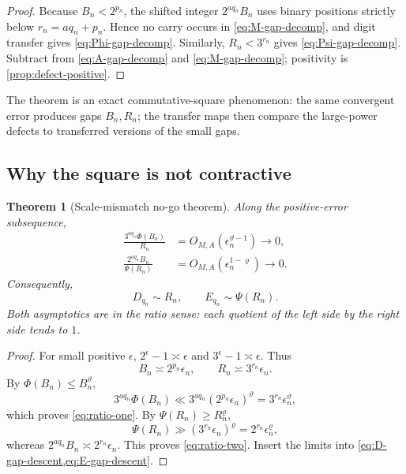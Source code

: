 \documentclass[11pt]{article}
\newtheorem{theorem}{Theorem}[section]
\theoremstyle{definition}
\begin{document}
\begin{proof}
Because \(B_n<2^{p_n}\), the shifted integer \(2^{aq_n}B_n\) uses binary
positions strictly below \(r_n=aq_n+p_n\).  Hence no carry occurs in
\cref{eq:M-gap-decomp}, and digit transfer gives
\cref{eq:Phi-gap-decomp}.  Similarly, \(R_n<3^{r_n}\) gives
\cref{eq:Psi-gap-decomp}.  Subtract from \cref{eq:A-gap-decomp} and
\cref{eq:M-gap-decomp}; positivity is \cref{prop:defect-positive}.
\end{proof}

The theorem is an exact commutative-square phenomenon: the same convergent
error produces gaps \(B_n,R_n\); the transfer maps then compare the
large-power defects to transferred versions of the small gaps.

\subsection{Why the square is not contractive}

\begin{theorem}[Scale-mismatch no-go theorem]\label{thm:scale-mismatch}
Along the positive-error subsequence,
\begin{align}
 \frac{3^{aq_n}\Phi(B_n)}{R_n}
 &=O_{M,A}(\epsilon_n^{\vartheta-1})\longrightarrow0,
 \label{eq:ratio-one}\\
 \frac{2^{aq_n}B_n}{\Psi(R_n)}
 &=O_{M,A}(\epsilon_n^{1-\varrho})\longrightarrow0.
 \label{eq:ratio-two}
\end{align}
Consequently,
\begin{equation}\label{eq:defect-asymp-gaps}
 D_{q_n}\sim R_n,
 \qquad
 E_{q_n}\sim\Psi(R_n).
\end{equation}
Both asymptotics are in the ratio sense: each quotient of the left side by
the right side tends to \(1\).
\end{theorem}

\begin{proof}
For small positive \(\epsilon\),
\(2^\epsilon-1\asymp\epsilon\) and
\(3^\epsilon-1\asymp\epsilon\).  Thus
\[
 B_n\asymp2^{p_n}\epsilon_n,
 \qquad
 R_n\asymp3^{r_n}\epsilon_n.
\]
By \(\Phi(B_n)\le B_n^\vartheta\),
\[
 3^{aq_n}\Phi(B_n)
 \ll3^{aq_n}(2^{p_n}\epsilon_n)^\vartheta
 =3^{r_n}\epsilon_n^\vartheta,
\]
which proves \cref{eq:ratio-one}.  By
\(\Psi(R_n)\ge R_n^\varrho\),
\[
 \Psi(R_n)\gg(3^{r_n}\epsilon_n)^\varrho
 =2^{r_n}\epsilon_n^\varrho,
\]
whereas \(2^{aq_n}B_n\asymp2^{r_n}\epsilon_n\).  This proves
\cref{eq:ratio-two}.  Insert the limits into
\cref{eq:D-gap-descent,eq:E-gap-descent}.
\end{proof}
\end{document}
